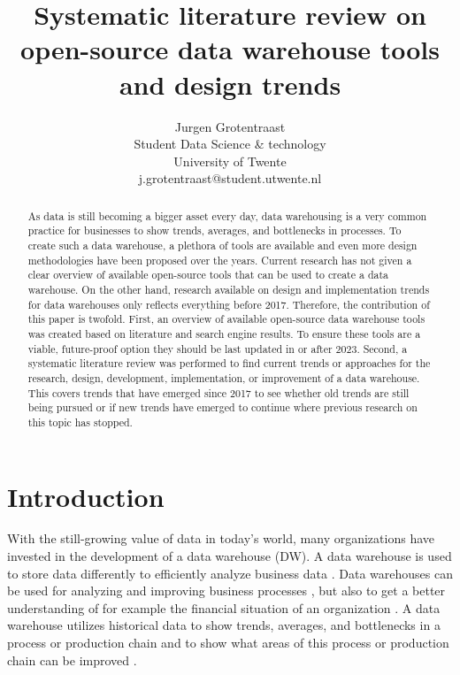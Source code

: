 \documentclass[11pt]{article}
\title{Systematic literature review on open-source data warehouse tools and design trends}
\author{Jurgen Grotentraast \\
  Student Data Science \& technology\\
  University of Twente \\
  j.grotentraast@student.utwente.nl\\}
\begin{document}
{\makeatletter\acl@finalcopytrue
  \maketitle
}
\begin{abstract}
As data is still becoming a bigger asset every day, data warehousing is a very common practice for businesses to show trends, averages, and bottlenecks in processes. To create such a data warehouse, a plethora of tools are available and even more design methodologies have been proposed over the years. Current research has not given a clear overview of available open-source tools that can be used to create a data warehouse.  On the other hand, research available on design and implementation trends for data warehouses only reflects everything before 2017. Therefore, the contribution of this paper is twofold. First, an overview of available open-source data warehouse tools was created based on literature and search engine results. To ensure these tools are a viable, future-proof option they should be last updated in or after 2023. Second, a systematic literature review was performed to find current trends or approaches for the research, design, development, implementation, or improvement of a data warehouse. This covers trends that have emerged since 2017 to see whether old trends are still being pursued or if new trends have emerged to continue where previous research on this topic has stopped. 
\end{abstract}

\section{Introduction}
With the still-growing value of data in today's world, many organizations have invested in the development of a data warehouse (DW). A data warehouse is used to store data differently to efficiently analyze business data \cite{gupta1997selection}. Data warehouses can be used for analyzing and improving business processes \cite{shahzad2009goal}, but also to get a better understanding of for example the financial situation of an organization \cite{lapura2018development}. A data warehouse utilizes historical data to show trends, averages, and bottlenecks in a process or production chain and to show what areas of this process or production chain can be improved \cite{Chaudhuri1997}. \\
\end{document}
